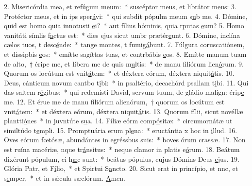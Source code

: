 2. Misericórdia mea, et refúgum m\uline{e}um:~* suscéptor meus, et librátor m\uline{e}us:
3. Protéctor meus, et in ips sper\uline{á}vi:~* qui subdit pópulm meum s\uline{u}b me.
4. Dómine, quid est homo quia innotusti \uline{e}i?~* aut fílius hóminis, quia rputas \uline{e}um?
5. Homo vanitáti símlis f\uline{a}ctus est:~* dies ejus sicut umbr prætér\uline{e}unt.
6. Dómine, inclína cælos tuos, t desc\uline{é}nde:~* tange montes, t fumig\uline{á}bunt.
7. Fúlgura coruscatiónem, et dissipbis \uline{e}os:~* emítte sagíttas tuas, et contrbábis \uline{e}os.
8. Emítte manum tuam de alto,~† éripe me, et líbera me de quis m\uline{u}ltis:~* de manu filiórum lien\uline{ó}rum.
9. Quorum os locútum est vnit\uline{á}tem:~* et déxtera eórum, déxtera niquit\uline{á}tis.
10. Deus, cánticum novum cantbo t\uline{i}bi:~* in psaltério, decachórd psallam t\uline{i}bi.
11. Qui das saltem r\uline{é}gibus:~* qui redemísti David, servum tuum, de gládio malígn: érip\uline{e} me.
12. Et érue me de manu filiórum alienórum,~† quorum os locútum est vnit\uline{á}tem:~* et déxtera eórum, déxtera niquit\uline{á}tis.
13. Quorum fílii, sicut novéllæ plantti\uline{ó}nes~* in juvntúte s\uline{u}a.
14. Fíliæ eórm comp\uline{ó}sitæ:~* circumornátæ ut similtúdo t\uline{e}mpli.
15. Promptuária erum pl\uline{e}na:~* eructántia x hoc in \uline{i}llud.
16. Oves eórum fœtósæ, abundántes in egréssbus s\uline{u}is:~* boves órum cr\uline{a}ssæ.
17. Non est ruína macériæ, nque tr\uline{á}nsitus:~* neque clamor in platis e\uline{ó}rum.
18. Beátum dixérunt pópulum, ci h\uline{æ}c sunt:~* beátus pópulus, cujus Dómins Deus \uline{e}jus.
19. Glória Patr, et F\uline{í}lio,~* et Spirtui S\uline{a}ncto.
20. Sicut erat in princípio, et nnc, et s\uline{e}mper,~* et in sǽcula sæclórum. \uline{A}men.
